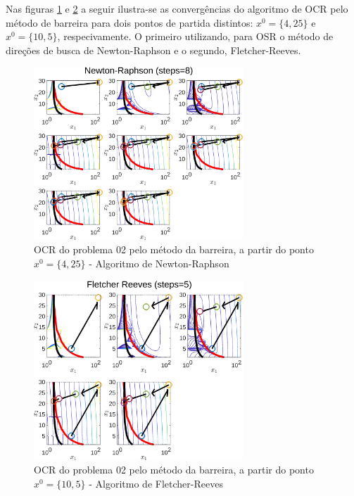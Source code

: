 \documentclass[10pt, a4paper]{article}
\begin{document}
Nas figuras \ref{fig:fig07} e \ref{fig:fig08} a seguir ilustra-se as converg\^encias do algoritmo de OCR pelo m\'etodo de barreira para dois pontos de partida distintos: $x^0=\{4,25\}$ e $x^0=\{10,5\}$, respecivamente. O primeiro utilizando, para OSR o m\'etodo de dire\c c\~oes de busca de Newton-Raphson e o segundo, Fletcher-Reeves.

\begin{figure}[H]
      \centering
      \includegraphics[width=0.7\textwidth]{fig07_P02_BAR_X1_NR.png}
      \caption{OCR do problema 02 pelo m\'etodo da barreira, a partir do ponto $x^0=\{4,25\}$ - Algoritmo de Newton-Raphson}
      \label{fig:fig07}
\end{figure}
\begin{figure}[H]
      \centering
      \includegraphics[width=0.7\textwidth]{fig08_P02_BAR_X2_FR.png}
      \caption{OCR do problema 02 pelo m\'etodo da barreira, a partir do ponto $x^0=\{10,5\}$ - Algoritmo de Fletcher-Reeves}
      \label{fig:fig08}
\end{figure}
\end{document}
